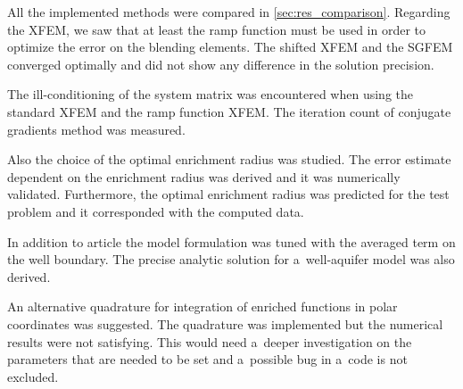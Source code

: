 All the implemented methods were compared in \ref{sec:res_comparison}. Regarding the XFEM, we saw that at 
least the ramp function must be used in order to optimize the error on the blending elements. 
The shifted XFEM and the SGFEM converged optimally and did not show any difference in the solution precision.

The ill-conditioning of the system matrix was encountered when using the standard XFEM and the ramp function XFEM.
The iteration count of conjugate gradients method was measured.

Also the choice of the optimal enrichment radius was studied. The error estimate dependent on the enrichment
radius was derived and it was numerically validated. Furthermore, the optimal enrichment radius was predicted 
for the test problem and it corresponded with the computed data.

In addition to article \cite{exner_2016} the model formulation was tuned with the averaged term on the well
boundary. The precise analytic solution for a~well-aquifer model was also derived.

An alternative quadrature for integration of enriched functions in polar coordinates was suggested.
The quadrature was implemented but the numerical results were not satisfying. This would need a~deeper 
investigation on the parameters that are needed to be set and a~possible bug in a~code is not excluded.
